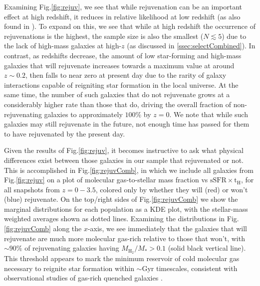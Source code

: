 \documentclass[twocolumn, linenumbers]{aastex631}
\newcommand{\mhh}{M_{\text{H}_2}}
\newcommand{\ssfr}{\text{sSFR}}
\newcommand{\tH}{\text{t}_\text{H}}
\renewcommand{\fig}{Fig.\hspace{.2em}}
\begin{document}
Examining \fig \ref{fig:rejuv}, we see that while rejuvenation can be an important effect at high redshift, it reduces in relative likelihood at low redshift (as also found in \citealt{Szpila25}).  To expand on this, we see that while at high redshift the occurrence of rejuvenations is the highest, the sample size is also the smallest ($N\lesssim 5$) due to the lack of high-mass galaxies at high-$z$ (as discussed in \ref{ssec:selectCombined}).  In contrast, as redshifts decrease, the amount of low star-forming and high-mass galaxies that will rejuvenate increases towards a maximum value at around $z\sim 0.2$, then falls to near zero at present day due to the rarity of galaxy interactions capable of reigniting star formation in the local universe.  At the same time, the number of such galaxies that do not rejuvenate grows at a considerably higher rate than those that do, driving the overall fraction of non-rejuvenating galaxies to approximately $100\%$ by $z=0$.  We note that while such galaxies may still rejuvenate in the future, not enough time has passed for them to have rejuvenated by the present day. 


Given the results of \fig \ref{fig:rejuv}, it becomes instructive to ask what physical differences exist between those galaxies in our sample that rejuvenated or not.  This is accomplished in \fig \ref{fig:rejuvComb}, in which we include all galaxies from \fig \ref{fig:rejuv} on a plot of molecular gas-to-stellar mass fraction vs $\ssfr\times\tH$, for all snapshots from $z=0-3.5$, colored only by whether they will (red) or won't (blue) rejuvenate.  On the top/right sides of \fig \ref{fig:rejuvComb} we show the marginal distributions for each population as a KDE plot, with the stellar-mass weighted averages shown as dotted lines.  Examining the distributions in \fig \ref{fig:rejuvComb} along the $x$-axis, we see immediately that the galaxies that will rejuvenate are much more molecular gas-rich relative to those that won't, with $\sim90\%$ of rejuvenating galaxies having $\mhh/M_*>0.1$ (solid black vertical line).  This threshold appears to mark the minimum reservoir of cold molecular gas necessary to reignite star formation within $\sim$Gyr timescales, consistent with observational studies of gas-rich quenched galaxies \citep[e.g.][]{french_2015, rowlands}.
\end{document}
